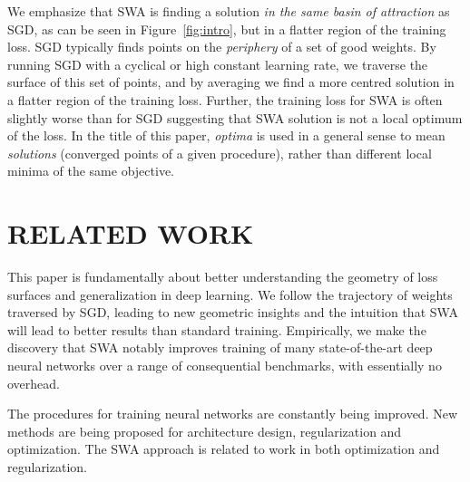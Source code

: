 \documentclass[letterpaper]{article}
\begin{document}
We emphasize that SWA is finding a solution \emph{in the same basin of attraction} as SGD,
as can be seen in Figure~\ref{fig:intro}, but in a flatter region of the training loss. 
SGD typically 
finds points on the \emph{periphery} of a set of good weights. By running SGD with a cyclical
or high constant learning rate, we traverse the surface of this set of points, and by averaging
we find a more centred solution in a flatter region of the training loss. 
Further, the training loss for SWA is often slightly worse than 
for SGD suggesting that SWA solution is not a local optimum of the loss.
In the title of this paper, \emph{optima} is used in a general sense to mean \emph{solutions} (converged
points of a given procedure), rather than different local minima of the same objective. 

\section{RELATED WORK}
\label{sec:related_work}

This paper is fundamentally about better understanding
the geometry of loss surfaces and generalization in deep
learning. We follow the trajectory of weights traversed by 
SGD, leading to new geometric insights and the intuition 
that SWA will lead to better results than standard training.
Empirically, we make the discovery that SWA notably improves 
training of many state-of-the-art deep neural networks over a range
of consequential benchmarks, with essentially no overhead.

The procedures for training neural networks are constantly being improved.
New methods are being proposed for architecture design, regularization and 
optimization. The SWA approach is related to work in both optimization and
regularization. 
\end{document}
